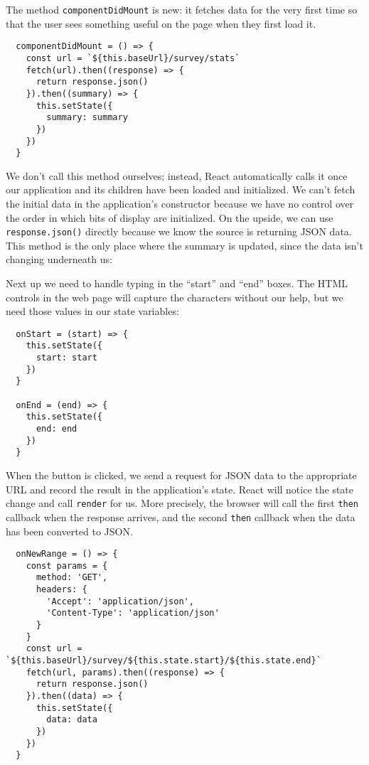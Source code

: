 The method \texttt{componentDidMount} is new:
it fetches data for the very first time
so that the user sees something useful on the page when they first load it.

\begin{verbatim}
  componentDidMount = () => {
    const url = `${this.baseUrl}/survey/stats`
    fetch(url).then((response) => {
      return response.json()
    }).then((summary) => {
      this.setState({
        summary: summary
      })
    })
  }
\end{verbatim}

We don't call this method ourselves;
instead,
React automatically calls it once our application and its children have been loaded and initialized.
We can't fetch the initial data in the application's constructor because
we have no control over the order in which bits of display are initialized.
On the upside,
we can use \texttt{response.json()} directly because we know the source is returning JSON data.
This method is the only place where the summary is updated,
since the data isn't changing underneath us:

Next up we need to handle typing in the ``start'' and ``end'' boxes.
The HTML controls in the web page will capture the characters without our help,
but we need those values in our state variables:

\begin{verbatim}
  onStart = (start) => {
    this.setState({
      start: start
    })
  }

  onEnd = (end) => {
    this.setState({
      end: end
    })
  }
\end{verbatim}

When the button is clicked,
we send a request for JSON data to the appropriate URL
and record the result in the application's state.
React will notice the state change and call \texttt{render} for us.
More precisely,
the browser will call the first \texttt{then} callback when the response arrives,
and the second \texttt{then} callback when the data has been converted to JSON.

\begin{verbatim}
  onNewRange = () => {
    const params = {
      method: 'GET',
      headers: {
        'Accept': 'application/json',
        'Content-Type': 'application/json'
      }
    }
    const url = `${this.baseUrl}/survey/${this.state.start}/${this.state.end}`
    fetch(url, params).then((response) => {
      return response.json()
    }).then((data) => {
      this.setState({
        data: data
      })
    })
  }
\end{verbatim}

